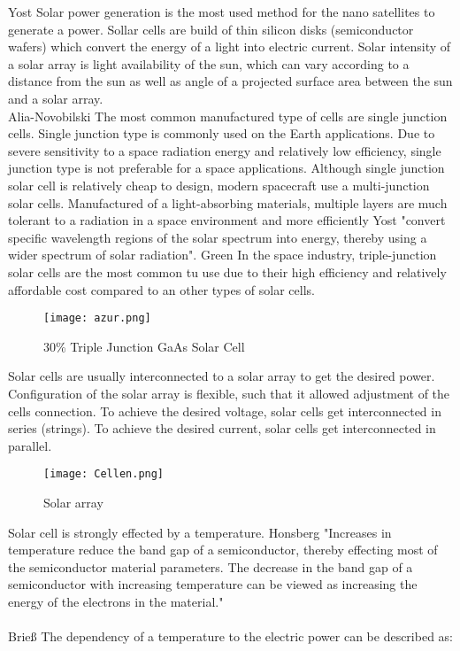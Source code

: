 Yost\cite{1} Solar power generation is the most used method for the nano satellites to generate a power. Sollar cells are build of thin silicon disks (semiconductor wafers)  which convert the energy of a light into electric current. Solar intensity of a solar array is light availability of the sun, which can vary according to a distance from the sun as well as angle of a projected surface area between the sun and a solar array.  
\\
\noindent\hspace*{3mm} Alia-Novobilski\cite{2} The most common manufactured type of cells are single junction cells. Single junction type is commonly used on the Earth applications. Due to severe sensitivity to a space radiation energy and relatively low efficiency, single junction type is not preferable for a space applications. Although single junction solar cell is relatively cheap to design, modern spacecraft use a multi-junction solar cells. Manufactured of a light-absorbing materials, multiple layers are much tolerant to a radiation in a space environment and more efficiently  Yost\cite{1} "convert specific wavelength regions of the solar spectrum into energy, thereby using a wider spectrum of solar radiation". 
Green\cite{3} In the space industry, triple-junction solar cells are the most common tu use due to their high efficiency and relatively affordable cost compared to an other types of solar cells. 

\begin{figure}[h]
	\centering
	\texttt{[image: azur.png]}
	\caption{ 30\% Triple Junction GaAs Solar Cell \cite{4}}
	\label{fig: EPS}
\end{figure}

Solar cells are usually interconnected to a solar array to get the desired power. Configuration of the solar array is flexible, such that it allowed adjustment of the cells connection. To achieve the desired voltage, solar cells get interconnected in series (strings). To achieve the desired current, solar cells get interconnected in parallel.\\

\newpage

\begin{figure}[h]
	\centering
	\texttt{[image: Cellen.png]}
	\caption{ Solar array}
	\label{fig: EPS}
\end{figure}
	
Solar cell is strongly effected by a temperature. Honsberg\cite{5} "Increases in temperature reduce the band gap of a semiconductor, thereby effecting most of the semiconductor material parameters. The decrease in the band gap of a semiconductor with increasing temperature can be viewed as increasing the energy of the electrons in the material."\\
\\
Brieß\cite{6} The dependency of a temperature to the electric power can be described as:\\ \\ \\

